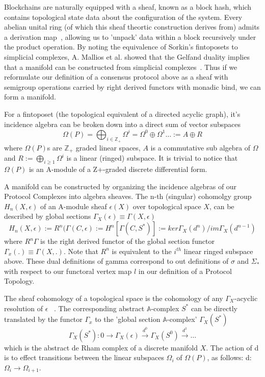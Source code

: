\documentclass[runningheads]{llncs}
\begin{document}
Blockchains are naturally equipped with a sheaf, known as a block hash, which contains topological state data about the configuration of the system. Every abelian unital ring (of which this sheaf theortic construction derives from) admits a derivation map~\cite{ref_article7}, allowing us to 'unpack' data within a block recursively under the product operation. By noting the equivalence of Sorkin's fintoposets to simplicial complexes, A. Mallios et al. showed that the Gelfand duality implies that a manifold can be constructed from simplicial complexes~\cite{ref_article6}. Thus if we reformulate our definition of a consensus protocol above as a sheaf with semigroup operations carried by right derived functors with monadic bind, we can form a manifold. 

For a fintoposet (the topological equivalent of a directed acyclic graph), it's incidence algebra can be broken down into a direct sum of vector subspaces
\begin{equation}
\Omega(P) = \bigoplus_{i \in \mathbb{Z}_+} \Omega^i = \Omega^0 \oplus \Omega^1 \dots := A \oplus R
\end{equation}
where $\Omega(P)$s are $\mathbb{Z}_+$ graded linear spaces, $A$ is a commutative sub algebra of $\Omega$ and $R := \bigoplus_{i \geq 1} \Omega^i$ is a linear (ringed) subspace. It is trivial to notice that $\Omega(P)$ is an A-module of a Z+-graded discrete differential form. 

A manifold can be constructed by organizing the incidence algebras of our Protocol Complexes into algebra sheaves. The n-th (singular) cohomolgy group $H_n(X, \epsilon)$ of an A-module sheaf $\epsilon(X)$ over topological space $X$, can be described by global sections $\Gamma_X(\epsilon) \equiv \Gamma (X, \epsilon)$
\begin{equation}
H_n(X, \epsilon) := R^n(\Gamma(C,\epsilon) := H^n[\Gamma(C, S^*)] := ker\Gamma_X(d^n)/im\Gamma_X(d^{n-1})
\end{equation}
where $R^n\Gamma$ is the right derived functor of the global section functor $\Gamma_x(.) \equiv \Gamma(X,.)$. Note that $R^n$ is equivalent to the $i^{th}$ linear ringed subspace above. These dual definitions of gamma correspond to out definitions of $\sigma$ and $\Sigma_*$ with respect to our functoral vertex map $l$ in our definition of a Protocol Topology.

The sheaf cohomology of a topological space is the cohomology of any $\Gamma_X$-acyclic resolution of $\epsilon$ ~\cite{ref_book1}. The corresponding abstract $\mathbb{A}$-complex $S^*$ can be directly translated by the functor $\Gamma_x$ to the 'global section $\mathbb{A}$-complex' $\Gamma_X(S^*)$
\begin{equation}
\Gamma_X(S^*):  0 \xrightarrow{~} \Gamma_X(\epsilon) \xrightarrow{d^0} \Gamma_X(S^0) \xrightarrow{d^1} \dots
\end{equation}
which is the abstract de Rham complex of a discrete manifold $X$. The action of d is to effect transitions between the linear subspaces $\Omega_i$ of $\Omega(P)$, as follows: d: $\Omega_i \rightarrow \Omega_{i+1}$.
\end{document}
